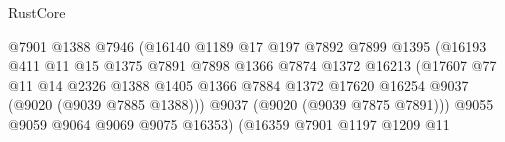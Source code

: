 \begin{lexlean}{RustCore}
\begin{coremodule}
                                            @7901
                                            @1388
                                            @7946
                                            (@16140
                                              @1189
                                              @17
                                              @197
                                              @7892
                                              @7899
                                              @1395
                                              (@16193
                                                @411
                                                @11
                                                @15
                                                @1375
                                                @7891
                                                @7898
                                                @1366
                                                @7874
                                                @1372
                                                @16213
                                                (@17607
                                                  @77
                                                  @11
                                                  @14
                                                  @2326
                                                  @1388
                                                  @1405
                                                  @1366
                                                  @7884
                                                  @1372
                                                  @17620
                                                  @16254
                                                  @9037
                                                  (@9020 (@9039 @7885 @1388)))
                                                @9037
                                                (@9020 (@9039 @7875 @7891)))
                                              @9055
                                              @9059
                                              @9064
                                              @9069
                                              @9075
                                              @16353)
                                            (@16359
                                              @7901
                                              @1197
                                              @1209
                                              @11

\end{coremodule}
\end{lexlean}
